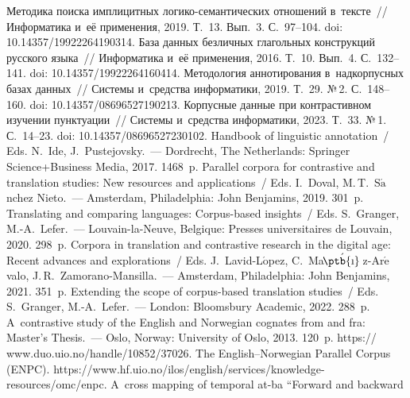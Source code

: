 \begin{multicols}{2}
{\small\frenchspacing
 { %
 \begin{thebibliography}{99}
 Методика поиска имплицитных ло\-ги\-ко-се\-ман\-ти\-че\-ских 
отношений в~текс\-те~// Информатика и~её применения, 2019. Т.~13. Вып.~3. С.~97--104.
doi: 10.14357/19922264190314.
 База данных безличных глагольных конструкций 
русского языка~// Информатика и~её применения, 2016. Т.~10. Вып.~4. С.~132--141.
doi: 10.14357/19922264160414.
 Методология аннотирования 
в~надкорпусных базах данных~// Сис\-те\-мы и~средства информатики, 2019. Т.~29. №\,2.  
С.~148--160. doi: 10.14357/08696527190213.
  Корпусные данные при конт\-рас\-тив\-ном изуче\-нии 
пунк\-ту\-ации~// Сис\-те\-мы и~средства информатики, 2023. Т.~33. №\,1. С.~14--23.
doi: 10.14357/08696527230102.
Handbook of linguistic annotation~/ Eds. N.~Ide, J.~Pustejovsky.~--- Dordrecht, The Netherlands: 
Springer Science\;+\;Business Media, 2017. 1468~p.
Parallel corpora for contrastive and translation studies: New resources and applications~/ Eds. 
I.~Doval, M.\,T.~S$\acute{\mbox{a}}$nchez Nieto.~--- Amsterdam, Philadelphia: John Benjamins, 
2019. 301~p.
Translating and comparing languages: Corpus-based insights~/ Eds. S.~Granger, M.-A.~Lefer.~--- 
Louvain-la-Neuve, Belgique: Presses universitaires de Louvain, 2020. 298~p.
Corpora in translation and contrastive research in the digital age: Recent advances and explorations~/ 
Eds. J.~Lavid-L$\acute{\mbox{o}}$pez, C.~\mbox{Ma$\acute{\mbox{\!\ptb{\i}}}$\,z}-Ar$\acute{\mbox{e}}$valo, 
J.\,R.~Zamorano-Mansilla.~--- Amsterdam, Philadelphia: John Benjamins, 2021. 351~p.
Extending the scope of corpus-based translation studies~/ Eds. S.~Granger, M.-A.~Lefer.~--- London: 
Bloomsbury Academic, 2022. 288~p.
 A~contrastive study of the English and Norwegian cognates from and fra: Master's 
Thesis.~--- Oslo, Norway: University of Oslo, 2013. 120~p. {\sf  
https:// www.duo.uio.no/handle/10852/37026}.
The English--Norwegian Parallel Corpus (\mbox{ENPC}). {\sf  
https://www.hf.uio.no/ilos/english/services/\linebreak knowledge-resources/omc/enpc}.
 A~cross mapping of temporal at-ba ``Forward and backward 

\end{thebibliography}}}
\end{multicols}
